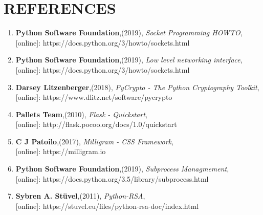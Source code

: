 \chapter*{\rm \large \bf REFERENCES}
\vspace{4.0mm}
\setlength{\parindent}{1cm} 

\begin{enumerate}
    \item \textbf{Python Software Foundation},(2019),
        \textit{Socket Programming HOWTO},\\
        \hspace{15mm}[online]: https://docs.python.org/3/howto/sockets.html

    \item \textbf{Python Software Foundation},(2019),
        \textit{Low level networking interface},\\
        \hspace{15mm}[online]: https://docs.python.org/3/howto/sockets.html

    \item \textbf{Darsey Litzenberger},(2018),
        \textit{PyCrypto - The Python Cryptography Toolkit},\\
        \hspace{15mm}[online]: https://www.dlitz.net/software/pycrypto

    \item \textbf{Pallets Team},(2010),
        \textit{Flask - Quickstart},\\
        \hspace{15mm}[online]: http://flask.pocoo.org/docs/1.0/quickstart

    \item \textbf{C J Patoilo},(2017),
        \textit{Milligram - CSS Framework},\\
        \hspace{15mm}[online]: https://milligram.io

    \item \textbf{Python Software Foundation},(2019),
        \textit{Subprocess Managmement},\\
        \hspace{15mm}[online]: https://docs.python.org/3.5/library/subprocess.html

    \item \textbf{Sybren A. Stüvel},(2011),
        \textit{Python-RSA},\\
        \hspace{15mm}[online]: https://stuvel.eu/files/python-rsa-doc/index.html


\end{enumerate}
